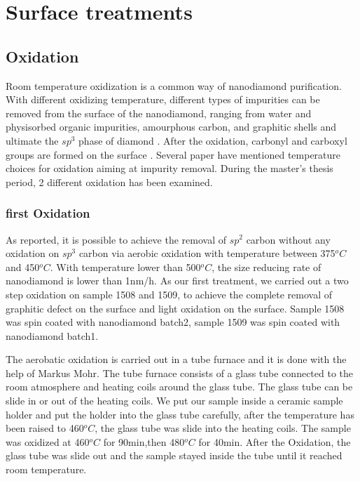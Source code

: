 
\chapter{Surface treatments} %

\label{Chapter2.5} %



\section{Oxidation}
Room temperature oxidization is a common way of nanodiamond purification. With different oxidizing temperature, different types of impurities can be removed from the surface of the nanodiamond, ranging from water and physisorbed organic impurities, amourphous carbon, and graphitic shells and ultimate the $sp^{3}$ phase of diamond \citep{t._gaebel_size-reduction_2012}. After the oxidation, carbonyl and carboxyl groups are formed on the surface \citep{wolcott_surface_2014}. Several paper have mentioned temperature choices for oxidation aiming at impurity removal.\citep{osswald_control_2006,wolcott_surface_2014,t._gaebel_size-reduction_2012} During the master's thesis period, 2 different oxidation has been examined.

\subsection[first Oxidation]{first Oxidation}
As reported, it is possible to achieve the removal of $sp^{2}$ carbon without any oxidation on $sp^{3}$ carbon via aerobic oxidation with temperature between 375$^{o}C$ and 450$^{o}C$. With temperature lower than 500$^{o}C$, the size reducing rate of nanodiamond is lower than 1nm/h. As our first treatment, we carried out a two step oxidation on sample 1508 and 1509, to achieve the complete removal of graphitic defect on the surface and light oxidation on the surface. Sample 1508 was spin coated with nanodiamond batch2, sample 1509 was spin coated with nanodiamond batch1.

The aerobatic oxidation is carried out in a tube furnace and it is done with the help of Markus Mohr. The tube furnace consists of a glass tube connected to the room atmosphere and heating coils around the glass tube. The glass tube can be slide in or out of the heating coils. We put our sample inside a ceramic sample holder and put the holder into the glass tube carefully, after the temperature has been raised to 460$^{o}C$, the glass tube was slide into the heating coils. The sample was oxidized at 460$^{o}C$ for 90min,then 480$^{o}C$ for 40min. After the Oxidation, the glass tube was slide out and the sample stayed inside the tube until it reached room temperature.


